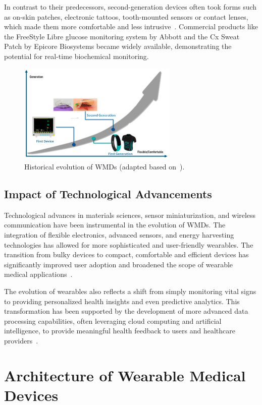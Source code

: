 \documentclass[journal]{IEEEtran}
\begin{document}
    In contrast to their predecessors, second-generation devices often took forms such as on-skin patches, electronic tattoos, tooth-mounted sensors or contact lenses, which made them more comfortable and less intrusive~\cite{Ates2022}. Commercial products like the FreeStyle Libre glucose monitoring system by Abbott and the Cx Sweat Patch by Epicore Biosystems became widely available, demonstrating the potential for real-time biochemical monitoring.

    \begin{figure}[!t]
    \centering
    \includegraphics[width=3in]{Figuras/history.jpeg}
    \caption{Historical evolution of WMDs (adapted based on~\cite{Ates2022}).}
    \label{fig:histoy}
    \end{figure}

    \subsection{Impact of Technological Advancements}

    Technological advances in materials sciences, sensor miniaturization, and wireless communication have been instrumental in the evolution of WMDs. The integration of flexible electronics, advanced sensors, and energy harvesting technologies has allowed for more sophisticated and user-friendly wearables. The transition from bulky devices to compact, comfortable and efficient devices has significantly improved user adoption and broadened the scope of wearable medical applications~\cite{Ates2022}.

    The evolution of wearables also reflects a shift from simply monitoring vital signs to providing personalized health insights and even predictive analytics. This transformation has been supported by the development of more advanced data processing capabilities, often leveraging cloud computing and artificial intelligence, to provide meaningful health feedback to users and healthcare providers~\cite{Ates2022}.

\section{Architecture of Wearable Medical Devices}
\label{4.Architecture}
\end{document}
